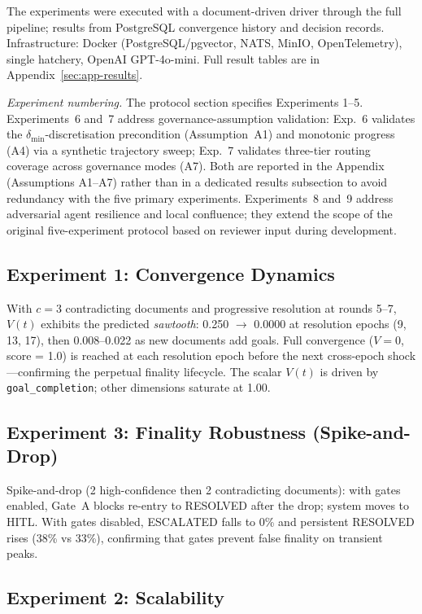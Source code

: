 \documentclass[11pt]{article}
\begin{document}
The experiments were executed with a document-driven driver through the full pipeline; results from PostgreSQL convergence history and decision records. Infrastructure: Docker (PostgreSQL/pgvector, NATS, MinIO, OpenTelemetry), single hatchery, OpenAI GPT-4o-mini. Full result tables are in Appendix~\ref{sec:app-results}.

\emph{Experiment numbering.} The protocol section specifies Experiments 1--5. Experiments~6 and~7 address governance-assumption validation: Exp.~6 validates the $\delta_{\min}$-discretisation precondition (Assumption~A1) and monotonic progress (A4) via a synthetic trajectory sweep; Exp.~7 validates three-tier routing coverage across governance modes (A7). Both are reported in the Appendix (Assumptions A1--A7) rather than in a dedicated results subsection to avoid redundancy with the five primary experiments. Experiments~8 and~9 address adversarial agent resilience and local confluence; they extend the scope of the original five-experiment protocol based on reviewer input during development.

\subsection{Experiment 1: Convergence Dynamics}

With $c = 3$ contradicting documents and progressive resolution at rounds 5--7, $V(t)$ exhibits the predicted \emph{sawtooth}: 0.250 $\to$ 0.0000 at resolution epochs (9, 13, 17), then 0.008--0.022 as new documents add goals. Full convergence ($V = 0$, score = 1.0) is reached at each resolution epoch before the next cross-epoch shock---confirming the perpetual finality lifecycle. The scalar $V(t)$ is driven by \texttt{goal\_completion}; other dimensions saturate at 1.00.

\subsection{Experiment 3: Finality Robustness (Spike-and-Drop)}

Spike-and-drop (2 high-confidence then 2 contradicting documents): with gates enabled, Gate~A blocks re-entry to RESOLVED after the drop; system moves to HITL. With gates disabled, ESCALATED falls to 0\% and persistent RESOLVED rises (38\% vs 33\%), confirming that gates prevent false finality on transient peaks.

\subsection{Experiment 2: Scalability}
\end{document}
